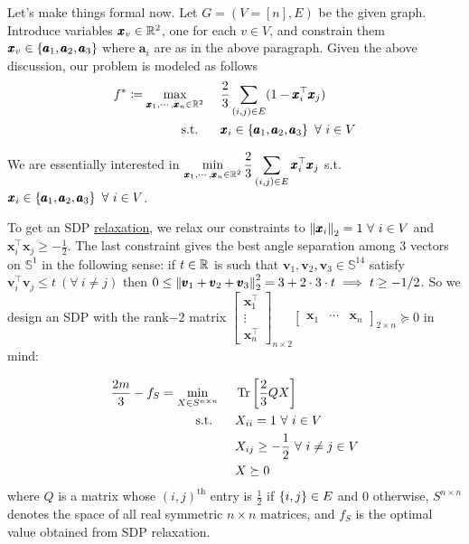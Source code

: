 Let's make things formal now. Let $G=(V=[n],E)$ be the given graph. Introduce variables $\pmb x_{v}\in \mathbb{R}^{2}$, one for each $v\in V$, and constrain them $\pmb x_{v}\in \left\{\pmb a_{1},\pmb a_{2}, \pmb a_{3}\right\}$ where $\pmb a_{i}$ are as in the above paragraph. Given the above discussion, our problem is modeled as follows
\begin{equation}\label{max3cut}\begin{aligned}
f^{*}\coloneqq \max_{\pmb x_{1},\cdots, \pmb x_{n}\in \mathbb{R}^{2}} &~~~~\frac{2}{3} \sum_{(i,j)\in E} (1-\pmb x_{i}^{\top}\pmb x_{j})\\
\text{s.t. } &~~~~ \pmb x_{i}\in \left\{\pmb a_{1},\pmb a_{2}, \pmb a_{3}\right\} ~\forall~ i\in V
\end{aligned}\end{equation}

We are essentially interested in $\displaystyle\min_{\pmb x_{1},\cdots, \pmb x_{n}\in \mathbb{R}^{2}}\frac{2}{3} \sum_{(i,j)\in E} \pmb x_{i}^{\top}\pmb x_{j}$ s.t. $\pmb x_{i}\in \left\{\pmb a_{1},\pmb a_{2}, \pmb a_{3}\right\} ~\forall~ i\in V$.

To get an SDP \underline{relaxation}, we relax our constraints to $\left\lVert \pmb x_{i} \right\rVert_{2} = 1~\forall~ i\in V$ and $\pmb x_{i}^{\top}\pmb x_{j} \ge -\frac{1}{2}$. The last constraint gives the best angle separation among $3$ vectors on $\mathbb S^{1}$ in the following sense: if $t\in \mathbb{R}$ is such that $\pmb v_{1},\pmb v_{2},\pmb v_{3}\in \mathbb S^{14}$ satisfy $\pmb v_{i}^{\top}\pmb v_{j} \le t ~(\forall~ i\ne j)$ then $0\le \left\lVert \pmb v_{1}+\pmb v_{2}+\pmb v_{3} \right\rVert_{2}^{2} = 3 + 2\cdot 3 \cdot t \implies t\ge -1/2$. So we design an SDP with the rank$-2$ matrix $\begin{bmatrix}\pmb x_{1}^{\top} \\ \vdots \\ \pmb x_{n}^{\top}\end{bmatrix}_{n\times 2}\begin{bmatrix}\pmb x_{1} & \cdots & \pmb x_{n}\end{bmatrix}_{2 \times n} \succeq 0$ in mind:

\begin{equation}\label{sdprelax}\begin{aligned}
\frac{2m}{3}- f_{S} = \min_{X\in S^{n\times n}} &~~~~  \operatorname{Tr}\left[\frac{2}{3}QX\right]\\
\text{s.t. } &~~~~ X_{ii} = 1 ~\forall~ i\in V\\
&~~~~ X_{ij} \ge -\frac{1}{2} ~\forall~ i\ne j\in V\\
&~~~~ X \succeq 0
\end{aligned}\end{equation}
where $Q$ is a matrix whose $(i,j)^{\text{th}}$ entry is $\frac{1}{2}$ if $\left\{i,j\right\}\in E$ and $0$ otherwise, $S^{n\times n}$ denotes the space of all real symmetric $n\times n$ matrices, and $f_{S}$ is the optimal value obtained from SDP relaxation. 

